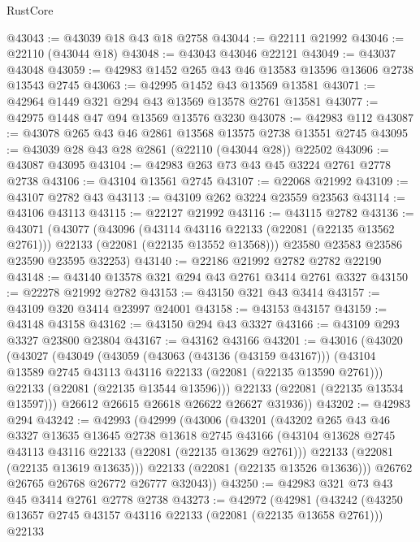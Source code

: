 \begin{lexlean}{RustCore}
\begin{coremodule}
@43043 := @43039 @18 @43 @18 @2758
@43044 := @22111 @21992
@43046 := @22110 (@43044 @18)
@43048 := @43043 @43046 @22121
@43049 := @43037 @43048
@43059 := @42983 @1452 @265 @43 @46 @13583 @13596 @13606 @2738 @13543 @2745
@43063 := @42995 @1452 @43 @13569 @13581
@43071 := @42964 @1449 @321 @294 @43 @13569 @13578 @2761 @13581
@43077 := @42975 @1448 @47 @94 @13569 @13576 @3230
@43078 := @42983 @112
@43087 := @43078 @265 @43 @46 @2861 @13568 @13575 @2738 @13551 @2745
@43095 := @43039 @28 @43 @28 @2861 (@22110 (@43044 @28)) @22502
@43096 := @43087 @43095
@43104 := @42983 @263 @73 @43 @45 @3224 @2761 @2778 @2738
@43106 := @43104 @13561 @2745
@43107 := @22068 @21992
@43109 := @43107 @2782 @43
@43113 := @43109 @262 @3224 @23559 @23563
@43114 := @43106 @43113
@43115 := @22127 @21992
@43116 := @43115 @2782
@43136 := @43071
    (@43077
      (@43096
        (@43114 @43116 @22133 (@22081 (@22135 @13562 @2761)))
        @22133
        (@22081 (@22135 @13552 @13568)))
      @23580
      @23583
      @23586
      @23590
      @23595
      @32253)
@43140 := @22186 @21992 @2782 @2782 @22190
@43148 := @43140 @13578 @321 @294 @43 @2761 @3414 @2761 @3327
@43150 := @22278 @21992 @2782
@43153 := @43150 @321 @43 @3414
@43157 := @43109 @320 @3414 @23997 @24001
@43158 := @43153 @43157
@43159 := @43148 @43158
@43162 := @43150 @294 @43 @3327
@43166 := @43109 @293 @3327 @23800 @23804
@43167 := @43162 @43166
@43201 := @43016
    (@43020
      (@43027
        (@43049
          (@43059
            (@43063 (@43136 (@43159 @43167)))
            (@43104 @13589 @2745 @43113 @43116 @22133 (@22081 (@22135 @13590 @2761)))
            @22133
            (@22081 (@22135 @13544 @13596)))
          @22133
          (@22081 (@22135 @13534 @13597)))
        @26612
        @26615
        @26618
        @26622
        @26627
        @31936))
@43202 := @42983 @294
@43242 := @42993
    (@42999
      (@43006
        (@43201
          (@43202
            @265
            @43
            @46
            @3327
            @13635
            @13645
            @2738
            @13618
            @2745
            @43166
            (@43104 @13628 @2745 @43113 @43116 @22133 (@22081 (@22135 @13629 @2761)))
            @22133
            (@22081 (@22135 @13619 @13635)))
          @22133
          (@22081 (@22135 @13526 @13636)))
        @26762
        @26765
        @26768
        @26772
        @26777
        @32043))
@43250 := @42983 @321 @73 @43 @45 @3414 @2761 @2778 @2738
@43273 := @42972
    (@42981
      (@43242
        (@43250 @13657 @2745 @43157 @43116 @22133 (@22081 (@22135 @13658 @2761)))
        @22133

\end{coremodule}
\end{lexlean}
